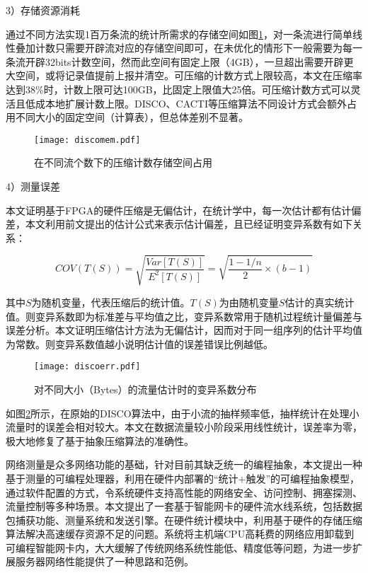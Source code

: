 3）存储资源消耗

通过不同方法实现1百万条流的统计所需求的存储空间如图\ref{fig:discomem}，对一条流进行简单线性叠加计数只需要开辟流对应的存储空间即可，在未优化的情形下一般需要为每一条流开辟32bits计数空间，然而此空间有固定上限（4GB），一旦超出需要开辟更大空间，或将记录值提前上报并清空。可压缩的计数方式上限较高，本文在压缩率达到38\%时，计数上限可达100GB，比固定上限值大25倍。可压缩计数方式可以灵活且低成本地扩展计数上限。DISCO、CACTI等压缩算法不同设计方式会额外占用不同大小的固定空间（计算表），但总体差别不显著。

\begin{figure}[!ht]
	\centering 
	\vspace{-1.5mm} 
	\texttt{[image: discomem.pdf]}
	\caption{在不同流个数下的压缩计数存储空间占用} \label{fig:discomem}
\end{figure}



4）测量误差

本文证明基于FPGA的硬件压缩是无偏估计，在统计学中，每一次估计都有估计偏差，本文利用前文提出的估计公式来表示估计偏差，且已经证明变异系数有如下关系：

\begin{equation} \label{mydiscofl}
COV(T(S))=\sqrt{\dfrac{Var[T(S)]}{E^2[T(S)]}}=\sqrt{\dfrac{1-1/n}{2}\times (b-1)}
\end{equation}

其中$ S $为随机变量，代表压缩后的统计值。$ T(S) $为由随机变量$ S $估计的真实统计值。则变异系数即为标准差与平均值之比，变异系数常用于随机过程统计量偏差与误差分析。本文证明压缩估计方法为无偏估计，因而对于同一组序列的估计平均值为常数。则变异系数值越小说明估计值的误差错误比例越低。

\begin{figure}[!ht]
	\centering 
	\vspace{-1.5mm} 
	\texttt{[image: discoerr.pdf]}
	\caption{对不同大小（Bytes）的流量估计时的变异系数分布} \label{fig:discoerr}
\end{figure}


如图\ref{fig:discoerr}所示，在原始的DISCO算法中，由于小流的抽样频率低，抽样统计在处理小流量时的误差会相对较大。本文在数据流量较小阶段采用线性统计，误差率为零，极大地修复了基于抽象压缩算法的准确性。


\label{chap38}


网络测量是众多网络功能的基础，针对目前其缺乏统一的编程抽象，本文提出一种基于测量的可编程处理器，利用在硬件内部署的“统计+触发”的可编程抽象模型，通过软件配置的方式，令系统硬件支持高性能的网络安全、访问控制、拥塞探测、流量控制等多种场景。本文提出了一套基于智能网卡的硬件流水线系统，包括数据包捕获功能、测量系统和发送引擎。在硬件统计模块中，利用基于硬件的存储压缩算法解决高速缓存资源不足的问题。系统将主机端CPU高耗费的网络应用卸载到可编程智能网卡内，大大缓解了传统网络系统性能低、精度低等问题，为进一步扩展服务器网络性能提供了一种思路和范例。

